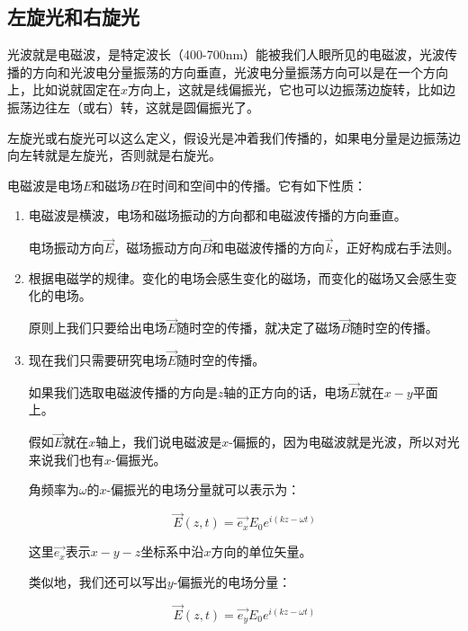 \subsection{左旋光和右旋光}

光波就是电磁波，是特定波长（400-700nm）能被我们人眼所见的电磁波，光波传播的方向和光波电分量振荡的方向垂直，光波电分量振荡方向可以是在一个方向上，比如说就固定在$x$方向上，这就是线偏振光，它也可以边振荡边旋转，比如边振荡边往左（或右）转，这就是圆偏振光了。

左旋光或右旋光可以这么定义，假设光是冲着我们传播的，如果电分量是边振荡边向左转就是左旋光，否则就是右旋光。

电磁波是电场$E$和磁场$B$在时间和空间中的传播。它有如下性质：

\begin{enumerate}
\item 

电磁波是横波，电场和磁场振动的方向都和电磁波传播的方向垂直。

电场振动方向$\vec E$，磁场振动方向$\vec B$和电磁波传播的方向$\vec k$，正好构成右手法则。

\item 

根据电磁学的规律。变化的电场会感生变化的磁场，而变化的磁场又会感生变化的电场。

原则上我们只要给出电场$\vec E$随时空的传播，就决定了磁场$\vec B$随时空的传播。

\item

现在我们只需要研究电场$\vec E$随时空的传播。

如果我们选取电磁波传播的方向是$z$轴的正方向的话，电场$\vec E$就在$x-y$平面上。

假如$\vec E$就在$x$轴上，我们说电磁波是$x$-偏振的，因为电磁波就是光波，所以对光来说我们也有$x$-偏振光。

角频率为$\omega$的$x$-偏振光的电场分量就可以表示为：

\begin{equation}
\vec E (z, t) = \vec {e_x} E_0 e^{i ( kz - \omega t ) }  
\end{equation}

这里$\vec {e_x}$表示$x-y-z$坐标系中沿$x$方向的单位矢量。

类似地，我们还可以写出$y$-偏振光的电场分量：

\begin{equation}
\vec E (z, t) = \vec {e_y} E_0 e^{i ( kz - \omega t ) }  
\end{equation}


\end{enumerate}

